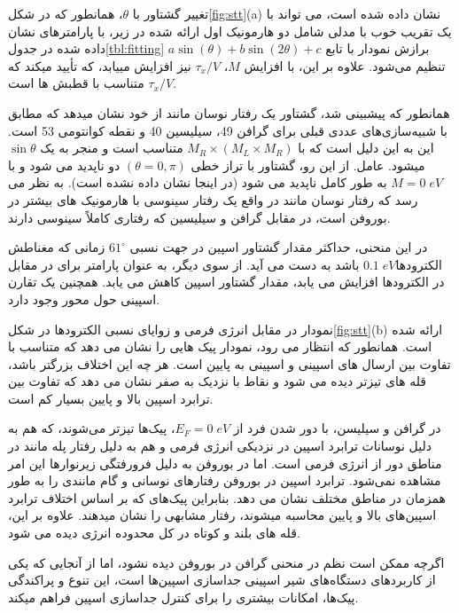 تغییر گشتاور با $\theta$، همانطور که در شکل\ref{fig:stt}(a) نشان داده شده است، می تواند با یک تقریب خوب با مدلی شامل دو هارمونیک اول ارائه شده در زیر، با پارامترهای نشان داده شده در جدول\ref{tbl:fitting} برازش نمودار  با تابع $a\sin(\theta)+b\sin(2\theta)+c$ تنظیم می‌شود. علاوه بر این، با افزایش $M$، $\tau_{x}/V$ نیز افزایش مییابد، که تأیید میکند که $\tau_{x}/V$ متناسب با قطبش  ها است.

همانطور که پیشبینی شد، گشتاور یک رفتار نوسان مانند از خود نشان میدهد که مطابق با شبیه‌سازی‌های عددی قبلی برای گرافن 49، سیلیسین 40 و نقطه کوانتومی 53 است. این به این دلیل است که  با $M_R \times (M_L \times M_R)$ متناسب است و منجر به یک $\sin\theta$ میشود. عامل. از این رو، گشتاور با تراز خطی $(\theta = 0, \pi)$ دو  ناپدید می شود و با $M = 0\; eV$ به طور کامل ناپدید می شود (در اینجا نشان داده نشده است). به نظر می رسد که رفتار نوسان مانند در واقع یک رفتار سینوسی با هارمونیک های بیشتر در بوروفن است، در مقابل گرافن و سیلیسین که رفتاری کاملاً سینوسی دارند. 

در این منحنی، حداکثر مقدار گشتاور اسپین در جهت نسبی $61^\circ$ زمانی که مغناطش الکترودها$0.1\;eV$ باشد به دست می آید. از سوی دیگر، به عنوان پارامتر برای  در مقابل در الکترودها افزایش می یابد، مقدار گشتاور اسپین کاهش می یابد. همچنین یک تقارن اسپینی حول محور وجود دارد. 

نمودار  در مقابل انرژی فرمی و زوایای نسبی الکترودها در شکل\ref{fig:stt}(b) ارائه شده است. همانطور که انتظار می رود، نمودار پیک هایی را نشان می دهد که متناسب با تفاوت بین ارسال های اسپینی و اسپینی به پایین است. هر چه این اختلاف بزرگتر باشد، قله های تیزتر دیده می شود و نقاط با  نزدیک به صفر نشان می دهد که تفاوت بین ترابرد اسپین بالا و پایین بسیار کم است. 

در گرافن و سیلیسن، با دور شدن فرد از $E_F = 0\; eV$، پیک‌ها تیزتر می‌شوند، که هم به دلیل نوسانات ترابرد اسپین در نزدیکی انرژی فرمی و هم به دلیل رفتار پله مانند در مناطق دور از انرژی فرمی است. اما در بوروفن به دلیل فرورفتگی زیر‌نوارها این امر مشاهده نمی‌شود. ترابرد اسپین در بوروفن رفتارهای نوسانی و گام مانندی را به طور همزمان در مناطق مختلف نشان می دهد. بنابراین پیک‌های  که بر اساس اختلاف ترابرد اسپین‌های بالا و پایین محاسبه میشوند، رفتار مشابهی را نشان میدهند. علاوه بر این، قله های بلند و کوتاه در کل محدوده انرژی دیده می شود. 

اگرچه ممکن است نظم در منحنی  گرافن در بوروفن دیده نشود، اما از آنجایی که یکی از کاربردهای دستگاه‌های شیر اسپینی جداسازی اسپین‌ها است، این تنوع و پراکندگی پیک‌ها، امکانات بیشتری را برای کنترل جداسازی اسپین فراهم میکند. 


